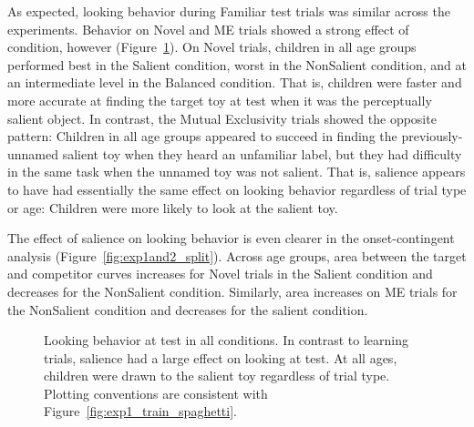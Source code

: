 \documentclass[man,floatsintext]{apa6}
\begin{document}
As expected, looking behavior during Familiar test trials was similar across the experiments. Behavior on Novel and ME trials showed a strong effect of condition, however (Figure~\ref{fig:exp1and2_test_spaghetti}). On Novel trials, children in all age groups performed best in the Salient condition, worst in the NonSalient condition, and at an intermediate level in the Balanced condition. That is, children were faster and more accurate at finding the target toy at test when it was the perceptually salient object. In contrast, the Mutual Exclusivity trials showed the opposite pattern: Children in all age groups appeared to succeed in finding the previously-unnamed salient toy when they heard an unfamiliar label, but they had difficulty in the same task when the unnamed toy was not salient. That is, salience appears to have had essentially the same effect on looking behavior regardless of trial type or age: Children were more likely to look at the salient toy.

The effect of salience on looking behavior is even clearer in the onset-contingent analysis (Figure~\ref{fig:exp1and2_split}). Across age groups, area between the target and competitor curves increases for Novel trials in the Salient condition and decreases for the NonSalient condition. Similarly, area increases on ME trials for the NonSalient condition and decreases for the salient condition. 

\begin{figure}[tb]
	\caption{\label{fig:exp1and2_test_spaghetti} Looking behavior at test in all conditions. In contrast to learning trials, salience had a large effect on looking at test. At all ages, children were drawn to the salient toy regardless of trial type. Plotting conventions are consistent with Figure~\ref{fig:exp1_train_spaghetti}.}
\end{figure}
\end{document}
